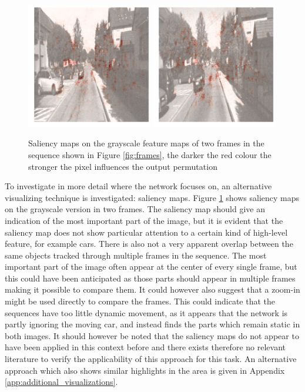 \begin{figure}[t]
\centering
\includegraphics[width=0.49\textwidth]{images/saliency_1-0.png}
\includegraphics[width=0.49\textwidth]{images/saliency_1-1.png}
\caption{Saliency maps on the grayscale feature maps of two frames in the sequence shown in Figure \ref{fig:frames}, the darker the red colour the stronger the pixel influences the output permutation}
\label{fig:saliency}
\end{figure}

To investigate in more detail where the network focuses on, an alternative visualizing technique is investigated: saliency maps. Figure \ref{fig:saliency} shows saliency maps on the grayscale version in two frames. The saliency map should give an indication of the most important part of the image, but it is evident that the saliency map does not show particular attention to a certain kind of high-level feature, for example cars. There is also not a very apparent overlap between the same objects tracked through multiple frames in the sequence. The most important part of the image often appear at the center of every single frame, but this could have been anticipated as those parts should appear in multiple frames making it possible to compare them. It could however also suggest that a zoom-in might be used directly to compare the frames. This could indicate that the sequences have too little dynamic movement, as it appears that the network is partly ignoring the moving car, and instead finds the parts which remain static in both images. It should however be noted that the saliency maps do not appear to have been applied in this context before and there exists therefore no relevant literature to verify the applicability of this approach for this task. An alternative approach which also shows similar highlights in the area is given in Appendix \ref{app:additional_visualizations}.

